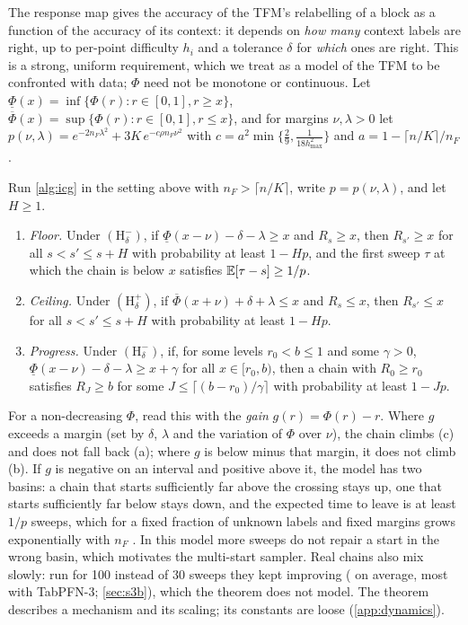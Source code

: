 The response map gives the accuracy of the TFM's relabelling of a block as a function of the accuracy of its context:
it depends on \emph{how many} context labels are right, up to per-point difficulty $h_i$ and a tolerance $\delta$ for
\emph{which} ones are right. This is a strong, uniform requirement, which we treat as a model of the TFM to be
confronted with data; $\Phi$ need not be monotone or continuous. Let
$\underline\Phi(x)=\inf\{\Phi(r):r\in[0,1],r\ge x\}$, $\overline\Phi(x)=\sup\{\Phi(r):r\in[0,1],r\le x\}$, and for
margins $\nu,\lambda>0$ let $p(\nu,\lambda)=e^{-2n_F\lambda^2}+3K\,e^{-c\rho n_F\nu^2}$ with
$c=a^2\min\{\tfrac29,\tfrac{1}{18h_{\max}^2}\}$ and $a=1-\lceil n/K\rceil/n_F$.

\begin{theorem}\label{thm:basins}
Run \cref{alg:icg} in the setting above with $n_F>\lceil n/K\rceil$, write $p=p(\nu,\lambda)$, and let $H\ge1$.
\begin{enumerate}
\item[(a)] \emph{Floor.} Under $(\mathrm H^-_\delta)$, if $\underline\Phi(x-\nu)-\delta-\lambda\ge x$ and $R_{s}\ge x$, then
  $R_{s'}\ge x$ for all $s<s'\le s+H$ with probability at least $1-Hp$, and the first sweep $\tau$ at which the chain is
  below $x$ satisfies $\mathbb{E}[\tau-s]\ge 1/p$.
\item[(b)] \emph{Ceiling.} Under $(\mathrm H^+_\delta)$, if $\overline\Phi(x+\nu)+\delta+\lambda\le x$ and $R_s\le x$, then
  $R_{s'}\le x$ for all $s<s'\le s+H$ with probability at least $1-Hp$.
\item[(c)] \emph{Progress.} Under $(\mathrm H^-_\delta)$, if, for some levels $r_0<b\le1$ and some $\gamma>0$,
  $\underline\Phi(x-\nu)-\delta-\lambda\ge x+\gamma$ for all $x\in[r_0,b)$, then a chain with $R_0\ge r_0$ satisfies $R_J\ge b$ for some
  $J\le\lceil(b-r_0)/\gamma\rceil$ with probability at least $1-Jp$.
\end{enumerate}
\end{theorem}

For a non-decreasing $\Phi$, read this with the \emph{gain} $g(r)=\Phi(r)-r$. Where $g$ exceeds a margin (set by
$\delta$, $\lambda$ and the variation of $\Phi$ over $\nu$), the chain climbs (c) and does not fall back (a); where $g$
is below minus that margin, it does not climb (b). If $g$ is negative on an interval and positive above it, the model
has two basins: a chain that starts sufficiently far above the crossing stays up, one that starts sufficiently far
below stays down, and the expected time to leave is at least $1/p$ sweeps, which for a fixed fraction of unknown labels
and fixed margins grows exponentially with $n_F$ . In this model more sweeps do not repair a start in the wrong
basin, which motivates the multi-start sampler. Real chains also mix slowly: run for 100 instead of 30 sweeps
they kept improving ( on average, most with TabPFN-3; \cref{sec:s3b}), which the theorem does not
model. The theorem describes a mechanism and its scaling; its constants are loose (\cref{app:dynamics}).

